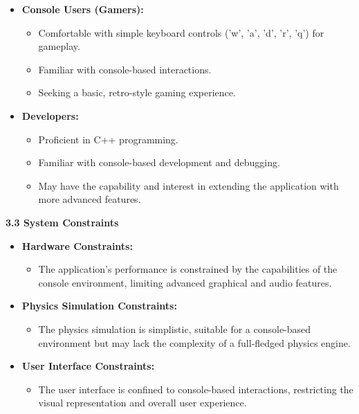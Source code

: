 \documentclass[
]{article}
\begin{document}
\begin{itemize}
\item
  \textbf{Console Users (Gamers):}

  \begin{itemize}
  \item
    Comfortable with simple keyboard controls ('w', 'a', 'd', 'r', 'q')
    for gameplay.
  \item
    Familiar with console-based interactions.
  \item
    Seeking a basic, retro-style gaming experience.
  \end{itemize}
\item
  \textbf{Developers:}

  \begin{itemize}
  \item
    Proficient in C++ programming.
  \item
    Familiar with console-based development and debugging.
  \item
    May have the capability and interest in extending the application
    with more advanced features.
  \end{itemize}
\end{itemize}

\protect\hypertarget{qeeee}{}{}\textbf{3.3 System Constraints}

\begin{itemize}
\item
  \textbf{Hardware Constraints:}

  \begin{itemize}
  \item
    The application's performance is constrained by the capabilities of
    the console environment, limiting advanced graphical and audio
    features.
  \end{itemize}
\item
  \textbf{Physics Simulation Constraints:}

  \begin{itemize}
  \item
    The physics simulation is simplistic, suitable for a console-based
    environment but may lack the complexity of a full-fledged physics
    engine.
  \end{itemize}
\item
  \textbf{User Interface Constraints:}

  \begin{itemize}
  \item
    The user interface is confined to console-based interactions,
    restricting the visual representation and overall user experience.
  \end{itemize}
\end{itemize}
\end{document}
